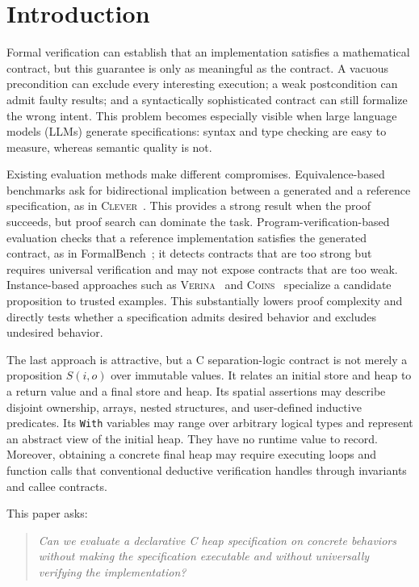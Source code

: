 \documentclass[10pt]{article}
\newcommand{\coins}{\textsc{Coins}}
\newcommand{\verina}{\textsc{Verina}}
\begin{document}
\section{Introduction}

Formal verification can establish that an implementation satisfies a
mathematical contract, but this guarantee is only as meaningful as the
contract.  A vacuous precondition can exclude every interesting execution; a
weak postcondition can admit faulty results; and a syntactically sophisticated
contract can still formalize the wrong intent.  This problem becomes especially
visible when large language models (LLMs) generate specifications: syntax and
type checking are easy to measure, whereas semantic quality is not.

Existing evaluation methods make different compromises.  Equivalence-based
benchmarks ask for bidirectional implication between a generated and a
reference specification, as in \textsc{Clever}~\citep{thakur2025clever}.  This
provides a strong result when the proof succeeds, but proof search can dominate
the task.  Program-verification-based evaluation checks that a reference
implementation satisfies the generated contract, as in
FormalBench~\citep{lecong2025formalbench}; it detects contracts that are too
strong but requires universal verification and may not expose contracts that
are too weak.  Instance-based approaches such as
\verina~\citep{ye2026verina} and \coins~\citep{yang2026coins} specialize a
candidate proposition to trusted examples.  This substantially lowers proof
complexity and directly tests whether a specification admits desired behavior
and excludes undesired behavior.

The last approach is attractive, but a C separation-logic contract is not
merely a proposition $S(i,o)$ over immutable values.  It relates an initial
store and heap to a return value and a final store and heap.  Its spatial
assertions may describe disjoint ownership, arrays, nested structures, and
user-defined inductive predicates.  Its \texttt{With} variables may range over
arbitrary logical types and represent an abstract view of the initial heap.
They have no runtime value to record.  Moreover, obtaining a concrete final
heap may require executing loops and function calls that conventional
deductive verification handles through invariants and callee contracts.

This paper asks:

\begin{quote}
\emph{Can we evaluate a declarative C heap specification on concrete behaviors
without making the specification executable and without universally verifying
the implementation?}
\end{quote}
\end{document}
